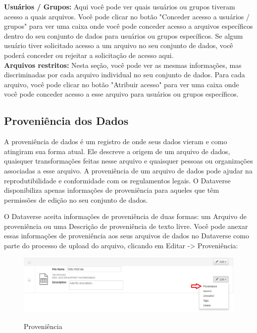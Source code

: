 \documentclass[12pt,hidelinks]{article}
\begin{document}
\textbf{Usuários / Grupos:} Aqui você pode ver quais usuários ou grupos tiveram acesso a quais arquivos. Você pode clicar no botão "Conceder acesso a usuários / grupos" para ver uma caixa onde você pode conceder acesso a arquivos específicos dentro do seu conjunto de dados para usuários ou grupos específicos. Se algum usuário tiver solicitado acesso a um arquivo no seu conjunto de dados, você poderá conceder ou rejeitar a solicitação de acesso aqui.\\

\textbf{Arquivos restritos:} Nesta seção, você pode ver as mesmas informações, mas discriminadas por cada arquivo individual no seu conjunto de dados. Para cada arquivo, você pode clicar no botão "Atribuir acesso" para ver uma caixa onde você pode conceder acesso a esse arquivo para usuários ou grupos específicos.
        
    \subsection{Proveniência dos Dados}
    
\qquad A proveniência de dados é um registro de onde seus dados vieram e como atingiram sua forma atual. Ele descreve a origem de um arquivo de dados, quaisquer transformações feitas nesse arquivo e quaisquer pessoas ou organizações associadas a esse arquivo. A proveniência de um arquivo de dados pode ajudar na reprodutibilidade e conformidade com os regulamentos legais. O Dataverse disponibiliza apenas informações de proveniência para aqueles que têm permissões de edição no seu conjunto de dados.

O Dataverse aceita informações de proveniência de duas formas: um Arquivo de proveniência ou uma Descrição de proveniência de texto livre. Você pode anexar essas informações de proveniência aos seus arquivos de dados no Dataverse como parte do processo de upload do arquivo, clicando em Editar -> Proveniência:
   
  \begin{figure}[H]
     \caption{Proveniência}
                \centering
         \includegraphics[scale=0.5]{imagens/prov.png}
            \label{Proveniência}
        \end{figure}
   \\
\end{document}

